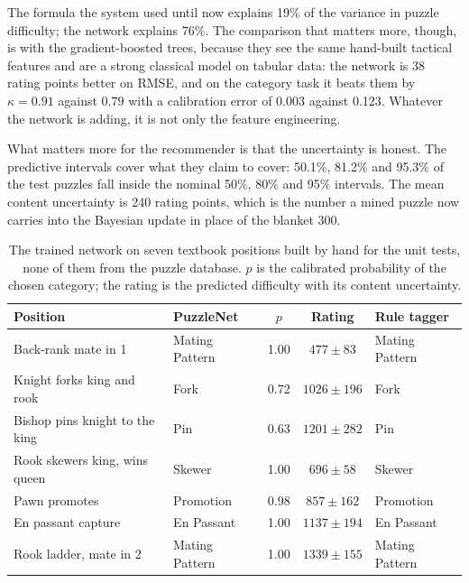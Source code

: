 The formula the system used until now explains 19\% of the variance in puzzle difficulty; the network
explains 76\%. The comparison that matters more, though, is with the gradient-boosted trees, because
they see the same hand-built tactical features and are a strong classical model on tabular data: the
network is 38 rating points better on RMSE, and on the category task it beats them by $\kappa = 0.91$
against $0.79$ with a calibration error of 0.003 against 0.123. Whatever the network is adding, it is
not only the feature engineering.

What matters more for the recommender is that the uncertainty is honest. The predictive intervals cover
what they claim to cover: 50.1\%, 81.2\% and 95.3\% of the test puzzles fall inside the nominal 50\%,
80\% and 95\% intervals. The mean content uncertainty is 240 rating points, which is the number a
mined puzzle now carries into the Bayesian update in place of the blanket 300.

\begin{table}[H]
\centering
\small
\caption{The trained network on seven textbook positions built by hand for the unit tests, none of
them from the puzzle database. $p$ is the calibrated probability of the chosen category; the rating is
the predicted difficulty with its content uncertainty.}\label{tab:nn-examples}
\begin{tabularx}{\linewidth}{Xlccl}
\toprule
\textbf{Position} & \textbf{PuzzleNet} & \textbf{$p$} & \textbf{Rating} & \textbf{Rule tagger} \\
\midrule
Back-rank mate in 1            & Mating Pattern & 1.00 & $477 \pm 83$   & Mating Pattern \\
Knight forks king and rook     & Fork           & 0.72 & $1026 \pm 196$ & Fork \\
Bishop pins knight to the king & Pin            & 0.63 & $1201 \pm 282$ & Pin \\
Rook skewers king, wins queen  & Skewer         & 1.00 & $696 \pm 58$   & Skewer \\
Pawn promotes                  & Promotion      & 0.98 & $857 \pm 162$  & Promotion \\
En passant capture             & En Passant     & 1.00 & $1137 \pm 194$ & En Passant \\
Rook ladder, mate in 2         & Mating Pattern & 1.00 & $1339 \pm 155$ & Mating Pattern \\
\bottomrule
\end{tabularx}
\end{table}

